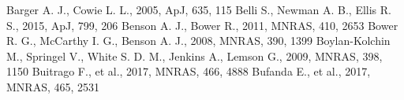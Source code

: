 \documentclass[useAMS,usenatbib]{mn2e}
\begin{document}
\begin{thebibliography}{}
 Barger A. J., Cowie L. L., 2005, ApJ, 635, 115
 Belli S., Newman A. B., Ellis R. S., 2015, ApJ, 799, 206
 Benson A. J., Bower R., 2011, MNRAS, 410, 2653
 Bower R. G., McCarthy I. G., Benson A. J., 2008, MNRAS, 390, 1399
 Boylan-Kolchin M., Springel V., White S. D. M., Jenkins A., Lemson G., 2009, MNRAS, 398, 1150
 Buitrago F., et al., 2017, MNRAS, 466, 4888
 Bufanda E., et al., 2017, MNRAS, 465, 2531

\end{thebibliography}
\end{document}

